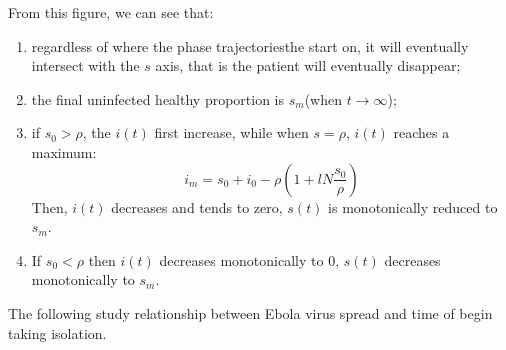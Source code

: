 From this figure, we can see that:
\begin{enumerate}
  \item regardless of where the phase trajectoriesthe start on,
   it will eventually intersect with the $s$ axis,
   that is the patient will eventually disappear;
  \item the final uninfected healthy proportion is
   $s_m$(when $t\rightarrow\infty$);
  \item if $s_0>\rho$, the $i(t)$ first increase, while when 
   $s=\rho$, $i(t)$ reaches a maximum:
   $$
	i_m=s_0+i_0-\rho(1+lN\frac{s_0}{\rho})
   \label{equ:11}
   $$
   Then, $i(t)$ decreases and tends to zero, $s(t)$ is
   monotonically reduced to $s_m$.
  \item If $s_0<\rho$ then $i(t)$ decreases monotonically to
   0, $s(t)$ decreases monotonically to $s_m$.
\end{enumerate}
The following study relationship between Ebola virus spread and
time of begin taking isolation.\par
